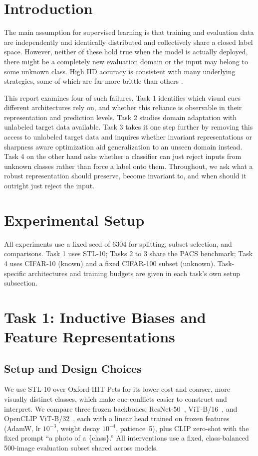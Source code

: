 \documentclass{article}
\begin{document}
\section{Introduction}
The main assumption for supervised learning is that training and evaluation data are independently and identically distributed and collectively share a closed label space. However, neither of these hold true when the model is actually deployed, there might be a completely new evaluation domain or the input may belong to some unknown class. High IID accuracy is consistent with many underlying strategies, some of which are far more brittle than others \citep{geirhos2019imagenet}.

This report examines four of such failures. Task 1 identifies which visual cues different architectures rely on, and whether this reliance is observable in their representation and prediction levels. Task 2 studies domain adaptation with unlabeled target data available. Task 3 takes it one step further by removing this access to unlabeled target data and inquires whether invariant representations or sharpness aware optimization aid generalization to an unseen domain instead. Task 4 on the other hand asks whether a classifier can just reject inputs from unknown classes rather than force a label onto them. Throughout, we ask what a robust representation should preserve, become invariant to, and when should it outright just reject the input.

\section{Experimental Setup}
All experiments use a fixed seed of 6304 for splitting, subset selection, and comparisons. Task 1 uses STL-10; Tasks 2 to 3 share the PACS benchmark; Task 4 uses CIFAR-10 (known) and a fixed CIFAR-100 subset (unknown). Task-specific architectures and training budgets are given in each task's own setup subsection.

\section{Task 1: Inductive Biases and Feature Representations}
\label{sec:task1}

\subsection{Setup and Design Choices}
We use STL-10 over Oxford-IIIT Pets for its lower cost and coarser, more visually distinct classes, which make cue-conflicts easier to construct and interpret. We compare three frozen backbones, ResNet-50~\citep{he2016resnet}, ViT-B/16~\citep{dosovitskiy2021vit}, and OpenCLIP ViT-B/32~\citep{radford2021clip}, each with a linear head trained on frozen features (AdamW, lr $10^{-3}$, weight decay $10^{-4}$, patience~5), plus CLIP zero-shot with the fixed prompt ``a photo of a \{class\}.'' All interventions use a fixed, class-balanced 500-image evaluation subset shared across models.
\end{document}
